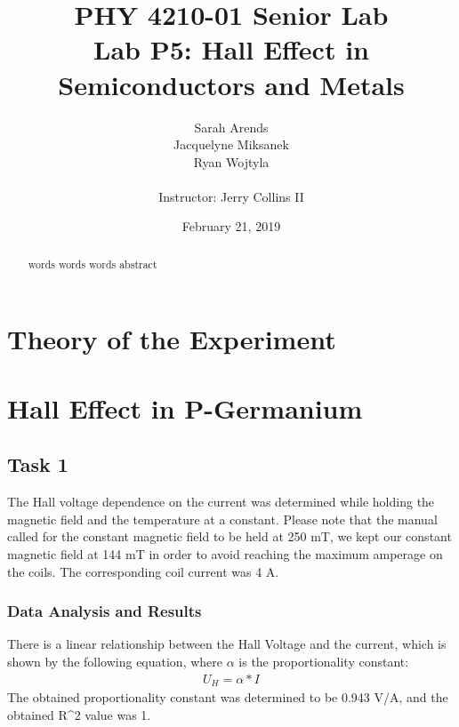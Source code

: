 \documentclass[a4paper]{article}
\title{PHY 4210-01 Senior Lab \\Lab P5: Hall Effect in Semiconductors and Metals}
\author{Sarah Arends \\ 
        Jacquelyne Miksanek \\
        Ryan Wojtyla \\ \\
        Instructor: Jerry Collins II}
\date{February 21, 2019}
\begin{document}
\maketitle 

\begin{abstract}
\qq words words words abstract
\end{abstract}

\newpage

\setcounter{tocdepth}{2}
\tableofcontents

\newpage

\section{Theory of the Experiment}

\section{Hall Effect in P-Germanium}

\subsection{Task 1}

\qq The Hall voltage dependence on the current was determined while
holding the magnetic field and the temperature at a constant. Please
note that the manual called for the constant magnetic field to be held
at 250 mT, we kept our constant magnetic field at 144 mT in order to
avoid reaching the maximum amperage on the coils. The corresponding
coil current was 4 A.

\subsubsection{Data Analysis and Results}
There is a linear relationship between the Hall Voltage and the
current, which is shown by the following equation, where $\alpha$ is
the proportionality constant:
\begin{align*}
U_H = \alpha * I
\end{align*}
The obtained proportionality constant was determined to be 0.943 V/A,
and the obtained R^2 value was 1.
\end{document}
